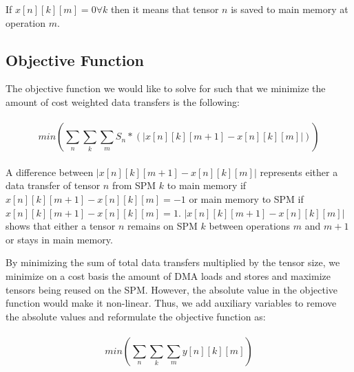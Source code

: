 If $x[n][k][m] = 0 \forall k$ then it means that tensor $n$ is saved to main memory at operation $m$.


\subsection{Objective Function}
The objective function we would like to solve for such that we minimize the
amount of cost weighted data transfers is the following:\\
\\
\[
min(\sum_n \sum_k \sum_m S_n * (|x[n][k][m+1] - x[n][k][m]|))
\]
\\

A difference between $|x[n][k][m+1] - x[n][k][m]|$ represents either a data
transfer of tensor $n$ from SPM $k$ to main memory if $x[n][k][m+1] -
x[n][k][m] = -1$ or main memory to SPM if $x[n][k][m+1] - x[n][k][m] = 1$.
$|x[n][k][m+1] - x[n][k][m]|$ shows that either a tensor $n$ remains on SPM $k$
between operations $m$ and $m+1$ or stays in main memory.

By minimizing the sum of total data transfers multiplied by the tensor size, we
minimize on a cost basis the amount of DMA loads and stores and maximize
tensors being reused on the SPM. However, the absolute value in the objective function
would make it non-linear. Thus, we add auxiliary variables to remove the absolute values
and reformulate the objective function as:\\
\\
\[
min(\sum_n \sum_k \sum_m y[n][k][m])
\]

